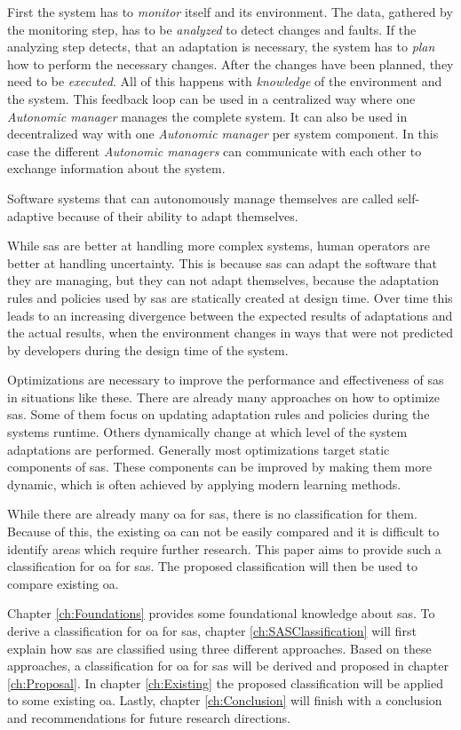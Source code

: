 \noindent First the system has to \textit{monitor} itself and its environment.
The data, gathered by the monitoring step, has to be \textit{analyzed} to detect changes and faults.
If the analyzing step detects, that an adaptation is necessary,
the system has to \textit{plan} how to perform the necessary changes.
After the changes have been planned, they need to be \textit{executed}.
All of this happens with \textit{knowledge} of the environment and the system.
This feedback loop can be used in a centralized way where one \textit{Autonomic manager} manages the complete system.
It can also be used in decentralized way with one \textit{Autonomic manager} per system component.
In this case the different \textit{Autonomic managers} can communicate with each other to exchange information about the system.

\noindent Software systems that can autonomously manage themselves are called self-adaptive
because of their ability to adapt themselves.

\noindent While \acrshort{sas} are better at handling more complex systems,
human operators are better at handling uncertainty.
This is because \acrshort{sas} can adapt the software that they are managing, but they can not adapt themselves,
because the adaptation rules and policies used by \acrshort{sas} are statically created at design time.
Over time this leads to an increasing divergence between the expected results of adaptations and the actual results,
when the environment changes in ways that were not predicted by developers during the design time of the system.

\noindent Optimizations are necessary to improve the performance and effectiveness of \acrshort{sas} in situations like these.
There are already many approaches on how to optimize \acrshort{sas}.
Some of them focus on updating adaptation rules and policies during the systems runtime.
Others dynamically change at which level of the system adaptations are performed.
Generally most optimizations target static components of \acrshort{sas}.
These components can be improved by making them more dynamic, 
which is often achieved by applying modern learning methods.

\noindent While there are already many \acrshort{oa} for \acrshort{sas},
there is no classification for them.
Because of this, the existing \acrshort{oa} can not be easily compared
and it is difficult to identify areas which require further research.
This paper aims to provide such a classification for \acrshort{oa} for \acrshort{sas}.
The proposed classification will then be used to compare existing \acrshort{oa}.

\noindent Chapter \ref{ch:Foundations} provides some foundational knowledge about \acrshort{sas}.
To derive a classification for \acrshort{oa} for \acrshort{sas},
chapter \ref{ch:SASClassification} will first explain how \acrshort{sas} are classified
using three different approaches.
Based on these approaches, a classification for \acrshort{oa} for \acrshort{sas} will be derived
and proposed in chapter \ref{ch:Proposal}.
In chapter \ref{ch:Existing} the proposed classification will be applied to some existing \acrshort{oa}.
Lastly, chapter \ref{ch:Conclusion} will finish with a conclusion and recommendations for future research directions.
